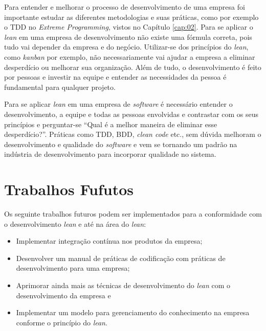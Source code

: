 Para entender e melhorar o processo de desenvolvimento de uma empresa foi importante estudar as diferentes metodologias e suas práticas, como por exemplo o TDD no \textit{Extreme Programming}, vistos no Capítulo \ref{cap:02}. Para se aplicar o \textit{lean} em uma empresa de desenvolvimento não existe uma fórmula correta, pois tudo vai depender da empresa e do negócio. Utilizar-se dos princípios do \textit{lean}, como \textit{kanban} por exemplo, não necessariamente vai ajudar a empresa a eliminar desperdício ou melhorar sua organização. Além de tudo, o desenvolvimento é feito por pessoas e investir na equipe e entender as necessidades da pessoa é fundamental para qualquer projeto.

Para se aplicar \textit{lean} em uma empresa de \textit{software} é necessário entender o desenvolvimento, a equipe e todas as pessoas envolvidas e contrastar com os seus princípios e perguntar-se ``Qual é a melhor maneira de eliminar esse desperdício?''. Práticas como TDD, BDD, \textit{clean code} etc., sem dúvida melhoram o desenvolvimento e qualidade do \textit{software} e vem se tornando um padrão na indústria de desenvolvimento para incorporar qualidade no sistema.


\section{Trabalhos Fufutos}

Os seguinte trabalhos futuros podem ser implementados para a conformidade com o desenvolvimento \textit{lean} e até na área do \textit{lean}:

\begin{itemize}
	\item Implementar integração contínua nos produtos da empresa;
	\item Desenvolver um manual de práticas de codificação com práticas de desenvolvimento para uma empresa;
	\item Aprimorar ainda mais as técnicas de desenvolvimento do \textit{lean} com o desenvolvimento da empresa e
	\item Implementar um modelo para gerenciamento do conhecimento na empresa conforme o princípio do \textit{lean}.
\end{itemize}